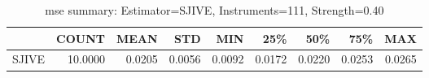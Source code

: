 \begin{table}[ht]
\centering
\caption{mse summary: Estimator=SJIVE, Instruments=111, Strength=0.40}
\begin{tabular}{lrrrrrrrr}
\toprule
 & COUNT & MEAN & STD & MIN & 25\% & 50\% & 75\% & MAX \\
\midrule
SJIVE & 10.0000 & 0.0205 & 0.0056 & 0.0092 & 0.0172 & 0.0220 & 0.0253 & 0.0265 \\
\bottomrule
\end{tabular}
\end{table}
